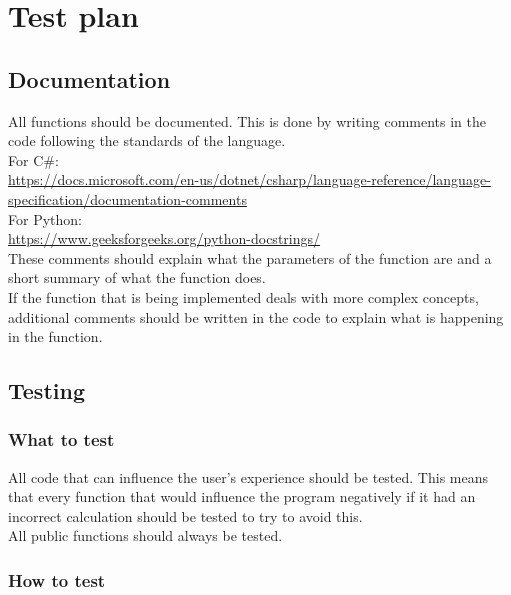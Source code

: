 \section{Test plan}
\label{app:test-plan}
\subsection{Documentation}
All functions should be documented. 
This is done by writing comments in the code following the standards of the language.
\\
For C\#: 
\\
\url{https://docs.microsoft.com/en-us/dotnet/csharp/language-reference/language-specification/documentation-comments}
\\
For Python:
\\
\url{https://www.geeksforgeeks.org/python-docstrings/}
\\
These comments should explain what the parameters of the function are and a short summary of what the function does.
\\
If the function that is being implemented deals with more complex concepts, additional comments should be written in the code to explain what is happening in the function.

\subsection{Testing}
\subsubsection{What to test}
All code that can influence the user's experience should be tested. 
This means that every function that would influence the program negatively if it had an incorrect calculation should be tested to try to avoid this.
\\
All public functions should always be tested.

\subsubsection{How to test}

